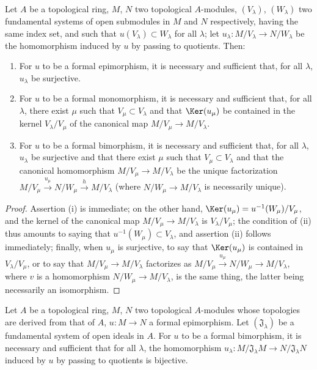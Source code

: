 \begin{proposition}[19.1.3]
\label{0.19.1.3}
Let $A$ be a topological ring, $M$, $N$ two topological $A$-modules, $(V_\lambda)$, $(W_\lambda)$ two fundamental systems of open submodules in $M$ and $N$ respectively, having the same index set, and such that $u(V_\lambda)\subset W_\lambda$ for all $\lambda$;
let $u_\lambda:M/V_\lambda\to N/W_\lambda$ be the homomorphism induced by $u$ by passing to quotients.
Then:
\begin{enumerate}
  \item[(i)] For $u$ to be a formal epimorphism, it is necessary and sufficient that, for all $\lambda$, $u_\lambda$ be surjective.
  \item[(ii)] For $u$ to be a formal monomorphism, it is necessary and sufficient that, for all $\lambda$, there exist $\mu$ such that $V_\mu\subset V_\lambda$ and that $\Ker(u_\mu)$ be contained in the kernel $V_\lambda/V_\mu$ of the canonical map $M/V_\mu\to M/V_\lambda$.
  \item[(iii)] For $u$ to be a formal bimorphism, it is necessary and sufficient that, for all $\lambda$, $u_\lambda$ be surjective and that there exist $\mu$ such that $V_\mu\subset V_\lambda$ and that the canonical homomorphism $M/V_\mu\to M/V_\lambda$ be the unique factorization $M/V_\mu\xrightarrow{u_\mu}N/W_\mu\xrightarrow{h}M/V_\lambda$ (where $N/W_\mu\to M/V_\lambda$ is necessarily unique).
\end{enumerate}
\end{proposition}

\begin{proof}
Assertion (i) is immediate;
on the other hand, $\Ker(u_\mu)=u^{-1}(W_\mu)/V_\mu$, and the kernel of the canonical map $M/V_\mu\to M/V_\lambda$ is $V_\lambda/V_\mu$;
the condition of (ii) thus amounts to saying that $u^{-1}(W_\mu)\subset V_\lambda$, and assertion (ii) follows immediately;
finally, when $u_\mu$ is surjective, to say that $\Ker(u_\mu)$ is contained in $V_\lambda/V_\mu$, or to say that $M/V_\mu\to M/V_\lambda$ factorizes as $M/V_\mu\xrightarrow{u_\mu}N/W_\mu\to M/V_\lambda$, where $v$ is a homomorphism $N/W_\mu\to M/V_\lambda$, is the same thing, the latter being necessarily an isomorphism.
\end{proof}

\begin{corollary}[19.1.4]
\label{0.19.1.4}
Let $A$ be a topological ring, $M$, $N$ two topological $A$-modules whose topologies are derived from that of $A$, $u:M\to N$ a formal epimorphism.
Let $(\mathfrak{J}_\lambda)$ be a fundamental system of open ideals in $A$.
For $u$ to be a formal bimorphism, it is necessary and sufficient that for all $\lambda$, the homomorphism $u_\lambda:M/\mathfrak{J}_\lambda M\to N/\mathfrak{J}_\lambda N$ induced by $u$ by passing to quotients is bijective.
\end{corollary}

